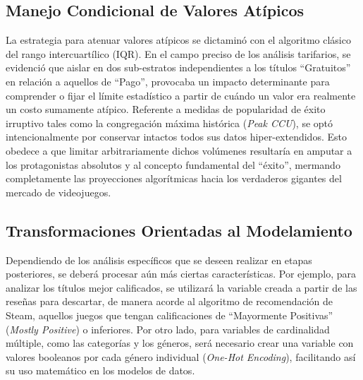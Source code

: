 \documentclass[conference]{IEEEtran}
\begin{document}
\subsection{Manejo Condicional de Valores Atípicos}
La estrategia para atenuar valores atípicos se dictaminó con el algoritmo clásico del rango intercuartílico (IQR). En el campo preciso de los análisis tarifarios, se evidenció que aislar en dos sub-estratos independientes a los títulos ``Gratuitos'' en relación a aquellos de ``Pago'', provocaba un impacto determinante para comprender o fijar el límite estadístico a partir de cuándo un valor era realmente un costo sumamente atípico. Referente a medidas de popularidad de éxito irruptivo tales como la congregación máxima histórica (\textit{Peak CCU}), se optó intencionalmente por conservar intactos todos sus datos hiper-extendidos. Esto obedece a que limitar arbitrariamente dichos volúmenes resultaría en amputar a los protagonistas absolutos y al concepto fundamental del ``éxito'', mermando completamente las proyecciones algorítmicas hacia los verdaderos gigantes del mercado de videojuegos.


\subsection{Transformaciones Orientadas al Modelamiento}
Dependiendo de los análisis específicos que se deseen realizar en etapas posteriores, se deberá procesar aún más ciertas características. Por ejemplo, para analizar los títulos mejor calificados, se utilizará la variable creada a partir de las reseñas para descartar, de manera acorde al algoritmo de recomendación de Steam, aquellos juegos que tengan calificaciones de ``Mayormente Positivas'' (\textit{Mostly Positive}) o inferiores. Por otro lado, para variables de cardinalidad múltiple, como las categorías y los géneros, será necesario crear una variable con valores booleanos por cada género individual (\textit{One-Hot Encoding}), facilitando así su uso matemático en los modelos de datos.
\end{document}

